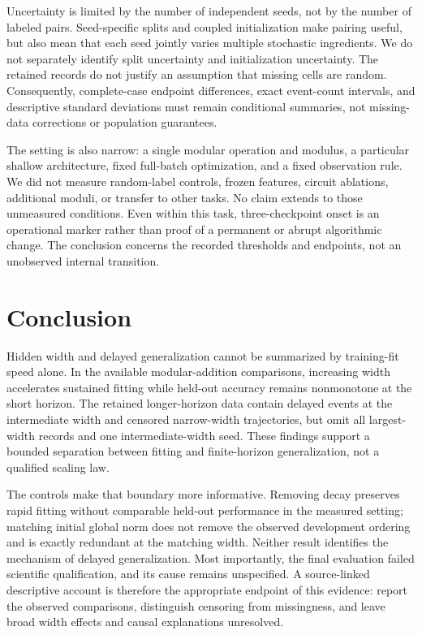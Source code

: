 \documentclass{article}
\begin{document}
Uncertainty is limited by the number of independent seeds, not by the number of labeled pairs. Seed-specific splits and coupled initialization make pairing useful, but also mean that each seed jointly varies multiple stochastic ingredients. We do not separately identify split uncertainty and initialization uncertainty. The retained records do not justify an assumption that missing cells are random. Consequently, complete-case endpoint differences, exact event-count intervals, and descriptive standard deviations must remain conditional summaries, not missing-data corrections or population guarantees.

The setting is also narrow: a single modular operation and modulus, a particular shallow architecture, fixed full-batch optimization, and a fixed observation rule. We did not measure random-label controls, frozen features, circuit ablations, additional moduli, or transfer to other tasks. No claim extends to those unmeasured conditions. Even within this task, three-checkpoint onset is an operational marker rather than proof of a permanent or abrupt algorithmic change. The conclusion concerns the recorded thresholds and endpoints, not an unobserved internal transition.

\section{Conclusion}
Hidden width and delayed generalization cannot be summarized by training-fit speed alone. In the available modular-addition comparisons, increasing width accelerates sustained fitting while held-out accuracy remains nonmonotone at the short horizon. The retained longer-horizon data contain delayed events at the intermediate width and censored narrow-width trajectories, but omit all largest-width records and one intermediate-width seed. These findings support a bounded separation between fitting and finite-horizon generalization, not a qualified scaling law.

The controls make that boundary more informative. Removing decay preserves rapid fitting without comparable held-out performance in the measured setting; matching initial global norm does not remove the observed development ordering and is exactly redundant at the matching width. Neither result identifies the mechanism of delayed generalization. Most importantly, the final evaluation failed scientific qualification, and its cause remains unspecified. A source-linked descriptive account is therefore the appropriate endpoint of this evidence: report the observed comparisons, distinguish censoring from missingness, and leave broad width effects and causal explanations unresolved.
\end{document}

